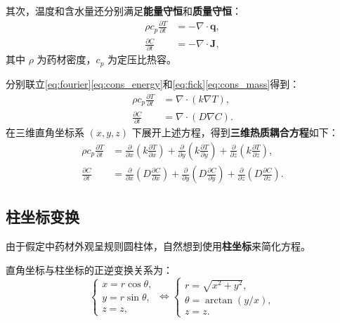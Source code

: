 \documentclass[12pt,a4paper,fontset=none]{ctexart}
\begin{document}
其次，温度和含水量还分别满足\textbf{能量守恒}和\textbf{质量守恒}：
\begin{align}
\rho c_p\frac{\partial T}{\partial t} &= -\nabla\cdot\mathbf{q},\label{eq:cons_energy}\\
\frac{\partial C}{\partial t} &= -\nabla\cdot\mathbf{J},\label{eq:cons_mass}
\end{align}
其中 $\rho$ 为药材密度，$c_p$ 为定压比热容。

分别联立\eqref{eq:fourier}\eqref{eq:cons_energy}和\eqref{eq:fick}\eqref{eq:cons_mass}得到：
\begin{align}
\rho c_p\frac{\partial T}{\partial t} &= \nabla\cdot(k\nabla T),\label{eq:div_heat}\\
\frac{\partial C}{\partial t} &= \nabla\cdot(D\nabla C).\label{eq:div_mass}
\end{align}
在三维直角坐标系 $(x,y,z)$ 下展开上述方程，得到\textbf{三维热质耦合方程}如下：
\begin{align}
\rho c_p\frac{\partial T}{\partial t}
&=\frac{\partial}{\partial x}\left(k\frac{\partial T}{\partial x}\right)
+\frac{\partial}{\partial y}\left(k\frac{\partial T}{\partial y}\right)
+\frac{\partial}{\partial z}\left(k\frac{\partial T}{\partial z}\right),\label{eq:cartesian_heat}\\
\frac{\partial C}{\partial t}
&=\frac{\partial}{\partial x}\left(D\frac{\partial C}{\partial x}\right)
+\frac{\partial}{\partial y}\left(D\frac{\partial C}{\partial y}\right)
+\frac{\partial}{\partial z}\left(D\frac{\partial C}{\partial z}\right).\label{eq:cartesian_mass}
\end{align}

\subsection{柱坐标变换}
由于假定中药材外观呈规则圆柱体，自然想到使用\textbf{柱坐标}来简化方程。

直角坐标与柱坐标的正逆变换关系为：
\begin{equation}
\begin{cases}
x = r\cos\theta,\\
y = r\sin\theta,\\
z = z,
\end{cases}
\iff
\begin{cases}
r = \sqrt{x^2+y^2},\\[4pt]
\theta = \arctan(y/x),\\[4pt]
z = z.
\end{cases}
\end{equation}
\end{document}
